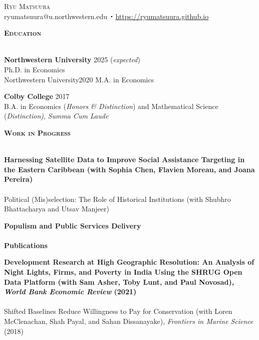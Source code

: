 \documentclass[11pt]{article}
\newcommand{\lineunder}{\vspace*{-8pt} \\ \hspace*{-18pt} \hrulefill \\}
\newcommand{\header}[1]{{\hspace*{-15pt}\vspace*{6pt} \textsc{#1}} \vspace*{-6pt} \lineunder}
\newcommand{\contact}[2]{
\begin{center}
{\LARGE \scshape {#1}}\\
#2
\end{center}
\vspace*{-8pt}
}
\newcommand{\sbt}{\,\begin{picture}(-1,1)(-1,-3)\circle*{2}\end{picture}\ }
\newcommand{\schoolwithcourses}[4]{
 \textbf{#1} \hfill{#2}\\
    #3\\
\vspace*{5pt}
}
\begin{document}

\small
\smallskip
\vspace*{-35pt}

\contact{Ryu Matsuura}
{ryumatsuura@u.northwestern.edu $\sbt$ \url{https://ryumatsuura.github.io}}


\header{\textbf{Education}}
\vspace{2mm}
\schoolwithcourses{Northwestern University}{2025 (\textit{expected})}{\hspace{2mm} Ph.D. in Economics}

\schoolwithcourses{Northwestern University}{2020}{\hspace{2mm} M.A. in Economics}

\schoolwithcourses{Colby College}{2017}{\hspace{2mm} B.A. in Economics (\textit{Honors \& Distinction}) and Mathematical Science (\textit{Distinction)}, \textit{Summa Cum Laude}}
\hfill{}
\vspace{3mm}


\header{\textbf{Work in Progress}}
\vspace{2mm}
\schoolwithcourses{Harnessing Satellite Data to Improve Social Assistance Targeting in the Eastern Caribbean \textnormal{(with Sophia Chen, Flavien Moreau, and Joana Pereira)}}{}{~\vspace{-3mm}}

\schoolwithcourses{Political (Mis)selection: The Role of Historical Institutions \textnormal{(with Shubhro Bhattacharya and Utsav Manjeer)}}{}{~\vspace{-3mm}}  


\schoolwithcourses{Populism and Public Services Delivery}{}{~\vspace{0mm}}  



\header{\textbf{Publications}}
\vspace{2mm}
\schoolwithcourses{Development Research at High Geographic Resolution: An Analysis of Night Lights, Firms, and Poverty in India Using the SHRUG Open Data Platform \textnormal{(with Sam Asher, Toby Lunt, and Paul Novosad), \textit{World Bank Economic Review} (2021)}}{}{~\vspace{-3mm}}  

\schoolwithcourses{Shifted Baselines Reduce Willingness to Pay for Conservation \textnormal{(with Loren McClenachan,
Shah Payal, and Sahan Dissanayake), \textit{Frontiers in Marine Science} (2018)}}{}{~\vspace{-3mm}} 
\end{document}
